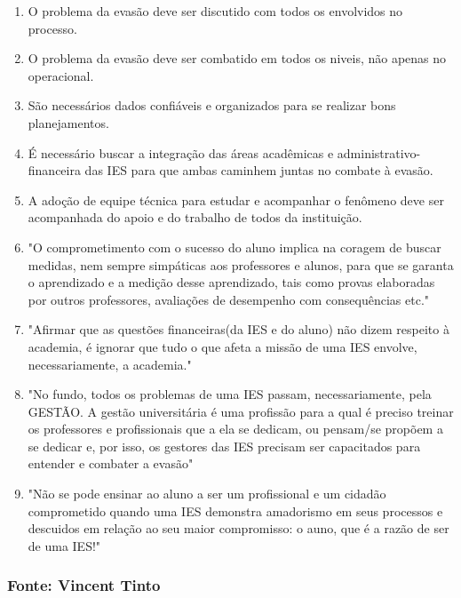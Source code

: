 \documentclass{report}
\begin{document}
\begin{enumerate}

\item O problema da evasão deve ser discutido com todos os envolvidos no processo.

\item O problema da evasão deve ser combatido em todos os niveis, não apenas no operacional.

\item São necessários dados confiáveis e organizados para se realizar bons planejamentos.

\item É necessário buscar a integração das áreas acadêmicas e administrativo-financeira das IES para que ambas caminhem juntas no combate à evasão.

\item A adoção de equipe técnica para estudar e acompanhar o fenômeno deve ser acompanhada do apoio e do trabalho de todos da instituição.

\item "O comprometimento com o sucesso do aluno implica na coragem de buscar medidas, nem sempre simpáticas aos professores e alunos, para que se garanta o aprendizado e a medição desse aprendizado, tais como provas elaboradas por outros professores, avaliações de desempenho com consequências etc."

\item "Afirmar que as questões financeiras(da IES e do aluno) não dizem respeito à academia, é ignorar que tudo o que afeta a missão de uma IES envolve, necessariamente, a academia."

\item "No fundo, todos os problemas de uma IES passam, necessariamente, pela GESTÃO. A gestão universitária é uma profissão para a qual é preciso treinar os professores e profissionais que a ela se dedicam, ou pensam/se propõem a se dedicar e, por isso, os gestores das IES precisam ser capacitados para entender e combater a evasão"

\item "Não se pode ensinar ao aluno a ser um profissional e um cidadão comprometido quando uma IES demonstra amadorismo em seus processos e descuidos em relação ao seu maior compromisso: o auno, que é a razão de ser de uma IES!"

\end{enumerate}

\subsubsection{Fonte: Vincent Tinto}
\end{document}
